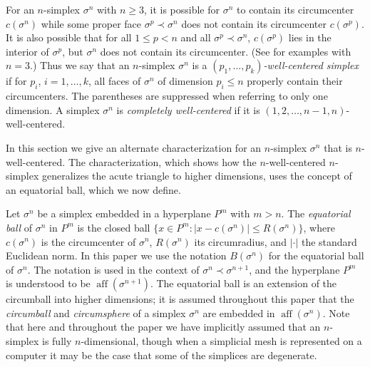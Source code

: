 \documentclass[final]{siamltex}
\DeclareMathOperator{\aff}{aff}
\begin{document}
For an $n$-simplex $\sigma^{n}$ with $n \ge 3$, it is possible for
$\sigma^{n}$ to contain its circumcenter $c(\sigma^{n})$ while some
proper face $\sigma^{p} \prec \sigma^{n}$ does not contain its
circumcenter $c(\sigma^{p})$.  It is also possible that for all $1 \le
p < n$ and all $\sigma^{p} \prec \sigma^{n}$, $c(\sigma^{p})$ lies in
the interior of $\sigma^{p}$, but $\sigma^{n}$ does not contain its
circumcenter.  (See \cite{VaHiGu2008} for examples with $n = 3$.)
Thus we say that an $n$-simplex $\sigma^{n}$ is a
{\emph{$(p_1,\ldots,p_k)$-well-centered simplex}} if for $p_i$, $i =
1,\ldots,k$, all faces of $\sigma^{n}$ of dimension $p_i \le n$
properly contain their circumcenters.  The parentheses are suppressed
when referring to only one dimension.  A simplex $\sigma^{n}$ is
{\emph{completely well-centered}} if it is
$(1,2,\ldots,n-1,n)$-well-centered.




In this section we give an alternate characterization for an
$n$-simplex $\sigma^{n}$ that is $n$-well-centered.
The characterization, which shows how the $n$-well-centered
$n$-simplex generalizes the acute triangle to higher dimensions,
uses the concept of an equatorial ball,
which we now define.

Let $\sigma^{n}$ be a simplex embedded in a
hyperplane $P^{m}$ with $m > n$.  The {\emph{equatorial ball}} of
$\sigma^{n}$ in $P^{m}$ is the closed ball $\{x \in P^{m}:\lvert x -
c(\sigma^{n})\rvert \le R(\sigma^{n})\}$, where $c(\sigma^{n})$ is the
circumcenter of $\sigma^{n}$, $R(\sigma^{n})$ its circumradius, and
$\lvert \cdot \rvert$ the standard Euclidean norm.  In this paper we
use the notation $B(\sigma^{n})$ for the equatorial ball of
$\sigma^{n}$.  The notation is used in the context of $\sigma^{n}
\prec \sigma^{n+1}$, and the hyperplane $P^{m}$
is understood to be $\aff(\sigma^{n+1})$.
The equatorial ball is an extension of the circumball into higher
dimensions; it is assumed throughout this paper that the
{\emph{circumball}} and {\emph{circumsphere}} of a simplex
$\sigma^{n}$ are embedded in $\aff({\sigma^{n}})$.  Note that here and
throughout the paper we have implicitly assumed that an $n$-simplex is
fully $n$-dimensional, though when a simplicial mesh is represented on
a computer it may be the case that some of the simplices are
degenerate.

\bigskip
\end{document}
